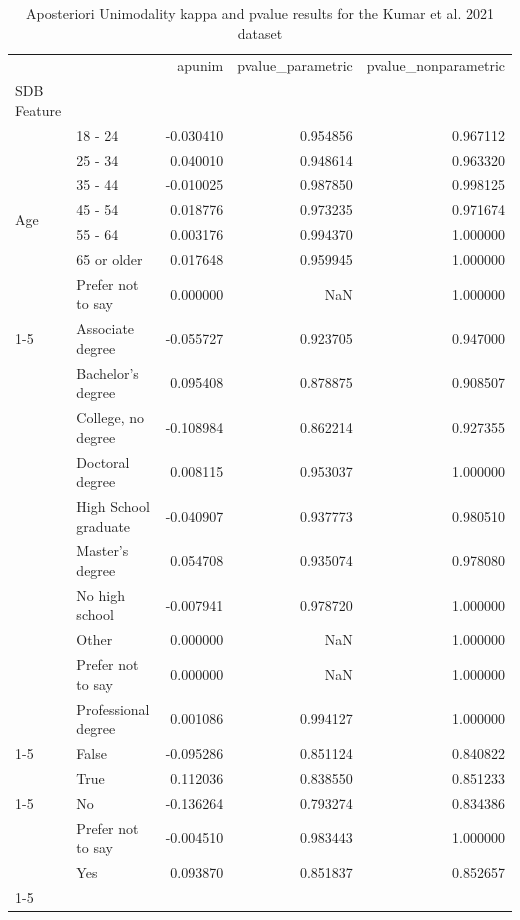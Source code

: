 \begin{table}
\caption{Aposteriori Unimodality kappa and pvalue results for the Kumar et al. 2021 dataset}
\label{tab:results_kumar}
\begin{tabular*}{\textwidth}{llrrr}
\toprule
 &  & apunim & pvalue\_parametric & pvalue\_nonparametric \\
SDB Feature &  &  &  &  \\
\midrule
\multirow[t]{7}{*}{Age} & 18 - 24 & -0.030410 & 0.954856 & 0.967112 \\
 & 25 - 34 & 0.040010 & 0.948614 & 0.963320 \\
 & 35 - 44 & -0.010025 & 0.987850 & 0.998125 \\
 & 45 - 54 & 0.018776 & 0.973235 & 0.971674 \\
 & 55 - 64 & 0.003176 & 0.994370 & 1.000000 \\
 & 65 or older & 0.017648 & 0.959945 & 1.000000 \\
 & Prefer not to say & 0.000000 & NaN & 1.000000 \\
\cline{1-5}
\multirow[t]{10}{*}{Education} & Associate degree & -0.055727 & 0.923705 & 0.947000 \\
 & Bachelor's degree & 0.095408 & 0.878875 & 0.908507 \\
 & College, no degree & -0.108984 & 0.862214 & 0.927355 \\
 & Doctoral degree & 0.008115 & 0.953037 & 1.000000 \\
 & High School graduate & -0.040907 & 0.937773 & 0.980510 \\
 & Master's degree & 0.054708 & 0.935074 & 0.978080 \\
 & No high school & -0.007941 & 0.978720 & 1.000000 \\
 & Other & 0.000000 & NaN & 1.000000 \\
 & Prefer not to say & 0.000000 & NaN & 1.000000 \\
 & Professional degree & 0.001086 & 0.994127 & 1.000000 \\
\cline{1-5}
\multirow[t]{2}{*}{Has Been Targeted} & False & -0.095286 & 0.851124 & 0.840822 \\
 & True & 0.112036 & 0.838550 & 0.851233 \\
\cline{1-5}
\multirow[t]{3}{*}{Is Parent} & No & -0.136264 & 0.793274 & 0.834386 \\
 & Prefer not to say & -0.004510 & 0.983443 & 1.000000 \\
 & Yes & 0.093870 & 0.851837 & 0.852657 \\
\cline{1-5}

\end{tabular*}
\end{table}

